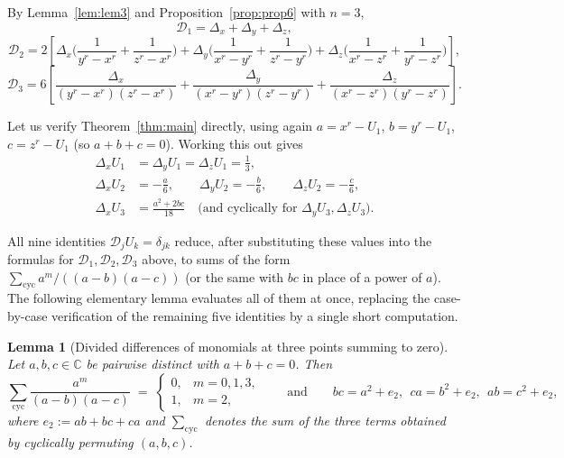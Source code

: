 \documentclass[10pt,a4paper]{amsart}
\newtheorem{lemma}[theorem]{Lemma}
\newcommand{\CC}{\mathbb{C}}
\begin{document}
By Lemma~\ref{lem:lem3} and Proposition~\ref{prop:prop6} with $n=3$,
\[
\mathcal D_1=\Delta_x+\Delta_y+\Delta_z,
\]
\[
\mathcal D_2=2\left[\Delta_x\Big(\frac{1}{y^r-x^r}+\frac{1}{z^r-x^r}\Big)+\Delta_y\Big(\frac{1}{x^r-y^r}+\frac{1}{z^r-y^r}\Big)+\Delta_z\Big(\frac{1}{x^r-z^r}+\frac{1}{y^r-z^r}\Big)\right],
\]
\[
\mathcal D_3=6\left[\frac{\Delta_x}{(y^r-x^r)(z^r-x^r)}+\frac{\Delta_y}{(x^r-y^r)(z^r-y^r)}+\frac{\Delta_z}{(x^r-z^r)(y^r-z^r)}\right].
\]

Let us verify Theorem~\ref{thm:main} directly, using again $a=x^r-U_1$, $b=y^r-U_1$, $c=z^r-U_1$ (so $a+b+c=0$). Working this out gives
\begin{align*}
\Delta_xU_1&=\Delta_yU_1=\Delta_zU_1=\frac13,\\
\Delta_xU_2&=-\frac a6,\qquad \Delta_yU_2=-\frac b6,\qquad \Delta_zU_2=-\frac c6,\\
\Delta_xU_3&=\frac{a^2+2bc}{18}\quad\text{(and cyclically for }\Delta_yU_3,\Delta_zU_3\text{)}.
\end{align*}

All nine identities $\mathcal D_jU_k=\delta_{jk}$ reduce, after substituting these values into the formulas for $\mathcal D_1,\mathcal D_2,\mathcal D_3$ above, to sums of the form $\sum_{\mathrm{cyc}}a^m/((a-b)(a-c))$ (or the same with $bc$ in place of a power of $a$). The following elementary lemma evaluates all of them at once, replacing the case-by-case verification of the remaining five identities by a single short computation.

\begin{lemma}[Divided differences of monomials at three points summing to zero]\label{lem:divdiff}
Let $a,b,c\in\CC$ be pairwise distinct with $a+b+c=0$. Then
\[
\sum_{\mathrm{cyc}}\frac{a^m}{(a-b)(a-c)} \;=\; \begin{cases} 0, & m=0,1,3,\\ 1, & m=2,\end{cases} \qquad\text{and}\qquad bc=a^2+e_2,\ \ ca=b^2+e_2,\ \ ab=c^2+e_2,
\]
where $e_2:=ab+bc+ca$ and $\sum_{\mathrm{cyc}}$ denotes the sum of the three terms obtained by cyclically permuting $(a,b,c)$.
\end{lemma}
\end{document}
